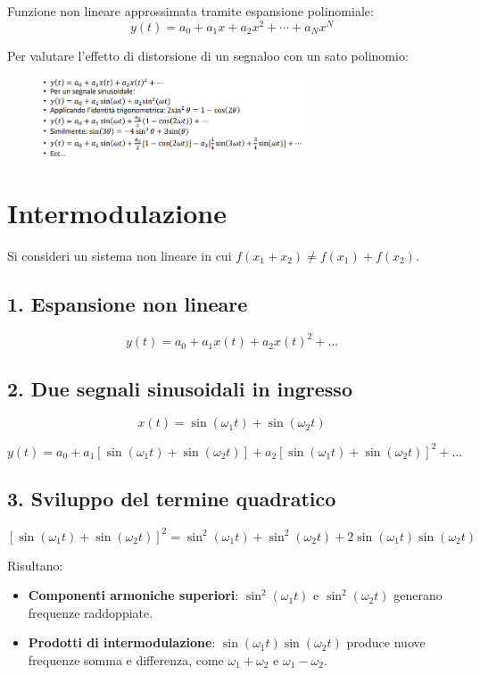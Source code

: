 Funzione non lineare approssimata tramite espansione polinomiale:
\[
y(t) = a_0 + a_1 x + a_2 x^2 + \cdots + a_N x^N
\]

Per valutare l’effetto di distorsione di un segnaloo con un sato polinomio:
\begin{figure}[H]
    \centering
    \includegraphics[width=0.7\textwidth]{capitoli/capitolo11/immagini/image2.png}
\end{figure}

\section*{Intermodulazione}

Si consideri un sistema non lineare in cui $f(x_1 + x_2) \neq f(x_1) + f(x_2)$.

\subsection*{1. Espansione non lineare}

\[
y(t) = a_0 + a_1 x(t) + a_2 x(t)^2 + \dots
\]

\subsection*{2. Due segnali sinusoidali in ingresso}

\[
x(t) = \sin(\omega_1 t) + \sin(\omega_2 t)
\]

\[
y(t) = a_0 + a_1[\sin(\omega_1 t) + \sin(\omega_2 t)] + a_2[\sin(\omega_1 t) + \sin(\omega_2 t)]^2 + \dots
\]

\subsection*{3. Sviluppo del termine quadratico}

\[
[\sin(\omega_1 t) + \sin(\omega_2 t)]^2 = \sin^2(\omega_1 t) + \sin^2(\omega_2 t) + 2\sin(\omega_1 t)\sin(\omega_2 t)
\]

Risultano:
\begin{itemize}
    \item \textbf{Componenti armoniche superiori}: $\sin^2(\omega_1 t)$ e $\sin^2(\omega_2 t)$ generano frequenze raddoppiate.
    \item \textbf{Prodotti di intermodulazione}: $\sin(\omega_1 t) \sin(\omega_2 t)$ produce nuove frequenze somma e differenza, come $\omega_1 + \omega_2$ e $\omega_1 - \omega_2$.
\end{itemize}

